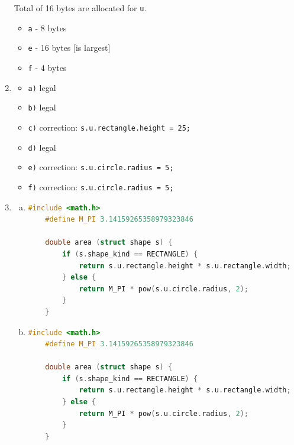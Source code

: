 \documentclass[12pt]{article}
\begin{document}
\begin{enumerate}[1.]
    Total of 16 bytes are allocated for \texttt{u}.

    \begin{itemize}
        \item \texttt{a} - 8 bytes
        \item \texttt{e} - 16 bytes [is largest]
        \item \texttt{f} - 4 bytes
    \end{itemize}

    \item

    \begin{itemize}
        \item \texttt{a)} legal
        \item \texttt{b)} legal
        \item \texttt{c)} correction: \texttt{s.u.rectangle.height = 25;}
        \item \texttt{d)} legal
        \item \texttt{e)} correction: \texttt{s.u.circle.radius = 5;}
        \item \texttt{f)} correction: \texttt{s.u.circle.radius = 5;}
    \end{itemize}

    \item

    \begin{enumerate}[a)]
        \item

\begin{lstlisting}[language=c]
    #include <math.h>
    #define M_PI 3.14159265358979323846

    double area (struct shape s) {
        if (s.shape_kind == RECTANGLE) {
            return s.u.rectangle.height * s.u.rectangle.width;
        } else {
            return M_PI * pow(s.u.circle.radius, 2);
        }
    }
\end{lstlisting}

        \item

\begin{lstlisting}[language=c]
    #include <math.h>
    #define M_PI 3.14159265358979323846

    double area (struct shape s) {
        if (s.shape_kind == RECTANGLE) {
            return s.u.rectangle.height * s.u.rectangle.width;
        } else {
            return M_PI * pow(s.u.circle.radius, 2);
        }
    }
\end{lstlisting}


\end{enumerate}
\end{enumerate}
\end{document}
